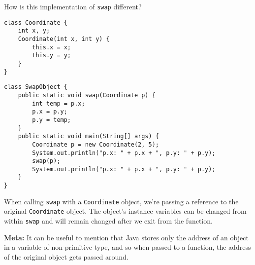 \question How is this implementation of \texttt{swap} different?

\begin{lstlisting}
class Coordinate {
    int x, y;
    Coordinate(int x, int y) {
        this.x = x;
        this.y = y;
    }
}
\end{lstlisting}

\begin{lstlisting}
class SwapObject {
    public static void swap(Coordinate p) {
        int temp = p.x;
        p.x = p.y;
        p.y = temp;
    }
    public static void main(String[] args) {
        Coordinate p = new Coordinate(2, 5);
        System.out.println("p.x: " + p.x + ", p.y: " + p.y);
        swap(p);
        System.out.println("p.x: " + p.x + ", p.y: " + p.y);
    }
}
\end{lstlisting}

\begin{solution}
When calling \lstinline$swap$ with a \lstinline$Coordinate$ object, we're passing a reference to the original \lstinline$Coordinate$ object. The object's instance variables can be changed from within \lstinline$swap$ and will remain changed after we exit from the function.

\textbf{Meta:} It can be useful to mention that Java stores only the address of an object in a variable of non-primitive type, and so when passed to a function, the address of the original object gets passed around. 
\end{solution}
